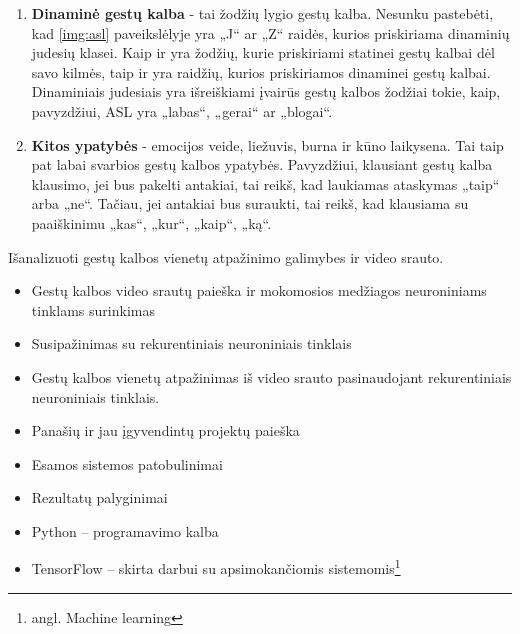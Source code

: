 \documentclass{VUMIFPSbakalaurinis}
\begin{document}
\begin{enumerate}
	\item\textbf{Dinaminė gestų kalba} - tai žodžių lygio gestų kalba. Nesunku pastebėti, kad \ref{img:asl} paveikslėlyje yra „J“ ar „Z“ raidės, kurios priskiriama dinaminių judesių klasei. Kaip ir yra žodžių, kurie priskiriami statinei gestų kalbai dėl savo kilmės, taip ir yra raidžių, kurios priskiriamos dinaminei gestų kalbai. Dinaminiais judesiais yra išreiškiami įvairūs gestų kalbos žodžiai tokie, kaip, pavyzdžiui, ASL yra „labas“, „gerai“ ar „blogai“.
	
	\item\textbf{Kitos ypatybės} - emocijos veide, liežuvis, burna ir kūno laikysena. Tai taip pat labai svarbios gestų kalbos ypatybės. Pavyzdžiui, klausiant gestų kalba klausimo, jei bus pakelti antakiai, tai reikš, kad laukiamas ataskymas „taip“ arba „ne“. Tačiau, jei antakiai bus suraukti, tai reikš, kad klausiama su paaiškinimu „kas“, „kur“, „kaip“, „ką“.
\end{enumerate}


Išanalizuoti gestų kalbos vienetų atpažinimo galimybes ir video srauto.

\begin{itemize}
	\item Gestų kalbos video srautų paieška ir mokomosios medžiagos neuroniniams tinklams surinkimas
	\item Susipažinimas su rekurentiniais neuroniniais tinklais
	\item Gestų kalbos vienetų atpažinimas iš video srauto pasinaudojant rekurentiniais neuroniniais tinklais.
\end{itemize}

\begin{itemize}
	\item Panašių ir jau įgyvendintų projektų paieška
	\item Esamos sistemos patobulinimai
	\item Rezultatų palyginimai
\end{itemize}

\begin{itemize}
	\item Python – programavimo kalba
	\item TensorFlow – skirta darbui su apsimokančiomis sistemomis\footnote{angl. Machine learning}
\end{itemize}
\end{document}
